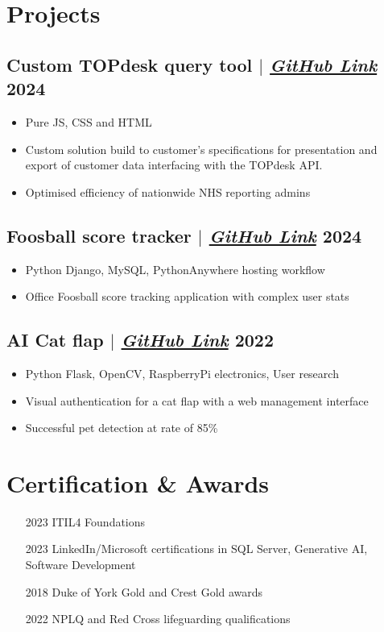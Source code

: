 \documentclass[10pt]{article}
\begin{document}
\section{Projects}
\subsection{Custom TOPdesk query tool {\normalfont $|$ \href{http://github.com}{\textit{GitHub Link}}} \hfill 2024}
\begin{itemize}
    \item Pure JS, CSS and HTML
    \item Custom solution build to customer's specifications for presentation and export of customer data interfacing with the TOPdesk API. 
    \item Optimised efficiency of nationwide NHS reporting admins
\end{itemize}

\subsection{Foosball score tracker {\normalfont $|$ \href{http://github.com}{\textit{GitHub Link}}} \hfill 2024}
\begin{itemize}
    \item Python Django, MySQL, PythonAnywhere hosting workflow
    \item Office Foosball score tracking application with complex user stats 
\end{itemize}

\subsection{AI Cat flap  {\normalfont $|$ \href{http://github.com}{\textit{GitHub Link}}} \hfill 2022}
\begin{itemize}
    \item Python Flask, OpenCV, RaspberryPi electronics, User research 
    \item Visual authentication for a cat flap with a web management interface 
    \item Successful pet detection at rate of 85\%
\end{itemize}





\section{Certification \& Awards}
\begin{enumerate}[itemsep=0pt]
  \item [2023] ITIL4 Foundations
  \item [2023] LinkedIn/Microsoft certifications in SQL Server, Generative AI, Software Development
  \item [2018] Duke of York Gold and Crest Gold awards
  \item [2022] NPLQ and Red Cross lifeguarding qualifications 
\end{enumerate}
\end{document}
